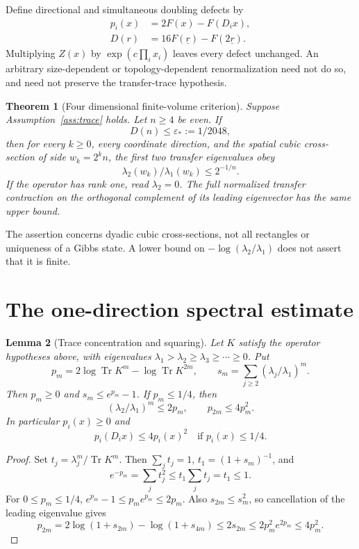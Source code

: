 \documentclass[11pt]{article}
\newtheorem{theorem}{Theorem}[section]
\newtheorem{lemma}[theorem]{Lemma}
\theoremstyle{definition}
\theoremstyle{remark}
\newcommand{\Tr}{\operatorname{Tr}}
\begin{document}
Define directional and simultaneous doubling defects by
\begin{align}
 p_i(x)&=2F(x)-F(D_i x),\\
 D(r)&=16F(\underline r)-F(2\underline r).\label{eq:D}
\end{align}
Multiplying $Z(x)$ by $\exp(c\prod_i x_i)$ leaves every defect unchanged.
An arbitrary size-dependent or topology-dependent renormalization need not
do so, and need not preserve the transfer-trace hypothesis.

\begin{theorem}[Four dimensional finite-volume criterion]\label{thm:main}
Suppose Assumption~\ref{ass:trace} holds. Let $n\ge4$ be even. If
\[
 D(n)\le\varepsilon_*:=1/2048,
\]
then for every $k\ge0$, every coordinate direction, and the spatial cubic
cross-section of side $w_k=2^k n$, the first two transfer eigenvalues obey
\[
 \lambda_2(w_k)/\lambda_1(w_k)\le2^{-1/n}.
\]
If the operator has rank one, read $\lambda_2=0$. The full normalized
transfer contraction on the orthogonal complement of its leading
eigenvector has the same upper bound.
\end{theorem}
The assertion concerns dyadic cubic cross-sections, not all rectangles or
uniqueness of a Gibbs state. A lower bound on
$-\log(\lambda_2/\lambda_1)$ does not assert that it is finite.

\section{The one-direction spectral estimate}
\begin{lemma}[Trace concentration and squaring]\label{lem:squaring}
Let $K$ satisfy the operator hypotheses above, with eigenvalues
$\lambda_1>\lambda_2\ge\lambda_3\ge\cdots\ge0$. Put
\[
 p_m=2\log\Tr K^m-\log\Tr K^{2m},\qquad
 s_m=\sum_{j\ge2}(\lambda_j/\lambda_1)^m.
\]
Then $p_m\ge0$ and $s_m\le e^{p_m}-1$. If $p_m\le1/4$, then
\[
 (\lambda_2/\lambda_1)^m\le2p_m,\qquad p_{2m}\le4p_m^2.
\]
In particular $p_i(x)\ge0$ and
\begin{equation}
 p_i(D_i x)\le4p_i(x)^2\quad\text{if }p_i(x)\le1/4.\label{eq:square}
\end{equation}
\end{lemma}
\begin{proof}
Set $t_j=\lambda_j^m/\Tr K^m$. Then $\sum_jt_j=1$,
$t_1=(1+s_m)^{-1}$, and
\[
 e^{-p_m}=\sum_jt_j^2\le t_1\sum_jt_j=t_1\le1.
\]
For $0\le p_m\le1/4$, $e^{p_m}-1\le p_m e^{p_m}\le2p_m$.
Also $s_{2m}\le s_m^2$, so cancellation of the leading eigenvalue gives
\[
 p_{2m}=2\log(1+s_{2m})-\log(1+s_{4m})
 \le2s_{2m}\le2p_m^2e^{2p_m}\le4p_m^2.
\]
\end{proof}
\end{document}
